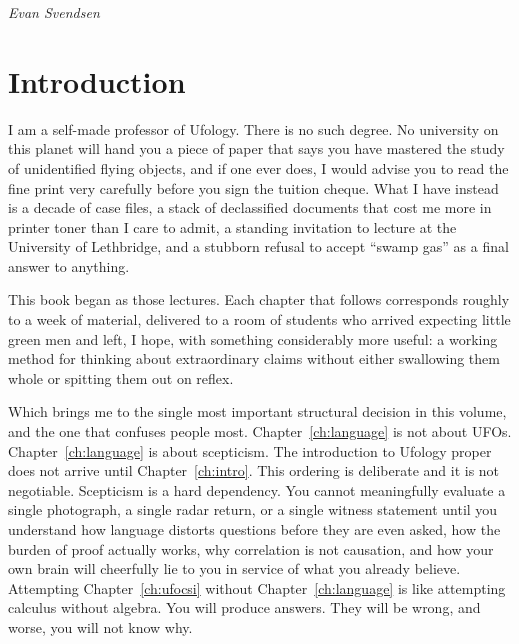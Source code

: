 \begin{flushright}
\itshape Evan Svendsen
\end{flushright}
\vspace{2pt}

\clearpage

\chapter*{Introduction}


I am a self-made professor of Ufology. There is no such degree. No university
on this planet will hand you a piece of paper that says you have mastered the
study of unidentified flying objects, and if one ever does, I would advise you
to read the fine print very carefully before you sign the tuition cheque. What
I have instead is a decade of case files, a stack of declassified documents
that cost me more in printer toner than I care to admit, a standing invitation
to lecture at the University of Lethbridge, and a stubborn refusal to accept
``swamp gas'' as a final answer to anything.

This book began as those lectures. Each chapter that follows corresponds
roughly to a week of material, delivered to a room of students who arrived
expecting little green men and left, I hope, with something considerably more
useful: a working method for thinking about extraordinary claims without
either swallowing them whole or spitting them out on reflex.

Which brings me to the single most important structural decision in this
volume, and the one that confuses people most. Chapter~\ref{ch:language} is not about UFOs.
Chapter~\ref{ch:language} is about scepticism. The introduction to Ufology proper does not
arrive until Chapter~\ref{ch:intro}. This ordering is deliberate and it is not negotiable.
Scepticism is a hard dependency. You cannot meaningfully evaluate a single
photograph, a single radar return, or a single witness statement until you
understand how language distorts questions before they are even asked, how
the burden of proof actually works, why correlation is not causation, and how
your own brain will cheerfully lie to you in service of what you already
believe. Attempting Chapter~\ref{ch:ufocsi} without Chapter~\ref{ch:language} is like attempting calculus
without algebra. You will produce answers. They will be wrong, and worse, you
will not know why.


